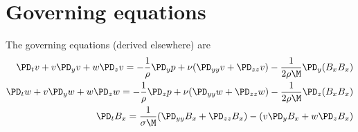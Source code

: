 \documentclass[11pt]{article}
\begin{document}
\doublespacing
\MOONSTITLE
\maketitle

\section{Governing equations}

The governing equations (derived elsewhere) are
\begin{equation}\begin{aligned}
\PD_t v+ v\PD_y v + w\PD_z v = -\frac{1}{\rho}\PD_y p+ \nu (\PD_{yy} v+\PD_{zz} v) - \frac{1}{2 \rho \M} \PD_y (B_x B_x) \\
\PD_t w+ v\PD_y w + w\PD_z w = -\frac{1}{\rho}\PD_z p+ \nu (\PD_{yy} w+\PD_{zz} w) - \frac{1}{2 \rho \M} \PD_z (B_x B_x) \\
\PD_t B_x = \frac{1}{\sigma \M} (\PD_{yy} B_x+\PD_{zz} B_x) - (v\PD_y B_x+w\PD_z B_x) \\
\end{aligned} \end{equation}
\end{document}
